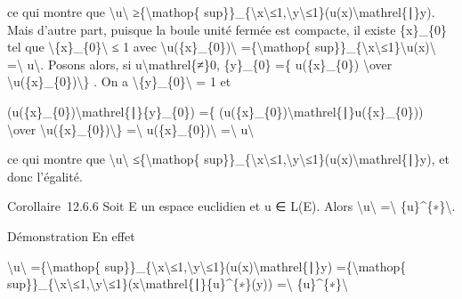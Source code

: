 \documentclass[]{article}
\begin{document}
ce qui montre que \textbackslash{}\textbar{}u\textbackslash{}\textbar{}
≥\{\textbackslash{}mathop\{
sup\}\}\_\{\textbackslash{}\textbar{}x\textbackslash{}\textbar{}≤1,\textbackslash{}\textbar{}y\textbackslash{}\textbar{}≤1\}\textbar{}(u(x)\textbackslash{}mathrel\{∣\}y)\textbar{}.
Mais d'autre part, puisque la boule unité fermée est compacte, il existe
\{x\}\_\{0\} tel que
\textbackslash{}\textbar{}\{x\}\_\{0\}\textbackslash{}\textbar{} ≤ 1
avec \textbackslash{}\textbar{}u(\{x\}\_\{0\})\textbackslash{}\textbar{}
=\{\textbackslash{}mathop\{
sup\}\}\_\{\textbackslash{}\textbar{}x\textbackslash{}\textbar{}≤1\}\textbackslash{}\textbar{}u(x)\textbackslash{}\textbar{}
=\textbackslash{}\textbar{} u\textbackslash{}\textbar{}. Posons alors,
si u\textbackslash{}mathrel\{≠\}0, \{y\}\_\{0\} =\{ u(\{x\}\_\{0\})
\textbackslash{}over
\textbackslash{}\textbar{}u(\{x\}\_\{0\})\textbackslash{}\textbar{}\} .
On a \textbackslash{}\textbar{}\{y\}\_\{0\}\textbackslash{}\textbar{} =
1 et

\textbar{}(u(\{x\}\_\{0\})\textbackslash{}mathrel\{∣\}\{y\}\_\{0\})\textbar{}
=\{ (u(\{x\}\_\{0\})\textbackslash{}mathrel\{∣\}u(\{x\}\_\{0\}))
\textbackslash{}over
\textbackslash{}\textbar{}u(\{x\}\_\{0\})\textbackslash{}\textbar{}\}
=\textbackslash{}\textbar{} u(\{x\}\_\{0\})\textbackslash{}\textbar{}
=\textbackslash{}\textbar{} u\textbackslash{}\textbar{}

ce qui montre que \textbackslash{}\textbar{}u\textbackslash{}\textbar{}
≤\{\textbackslash{}mathop\{
sup\}\}\_\{\textbackslash{}\textbar{}x\textbackslash{}\textbar{}≤1,\textbackslash{}\textbar{}y\textbackslash{}\textbar{}≤1\}\textbar{}(u(x)\textbackslash{}mathrel\{∣\}y)\textbar{},
et donc l'égalité.

Corollaire~12.6.6 Soit E un espace euclidien et u ∈ L(E). Alors
\textbackslash{}\textbar{}u\textbackslash{}\textbar{}
=\textbackslash{}\textbar{} \{u\}\^{}\{∗\}\textbackslash{}\textbar{}.

Démonstration En effet

\textbackslash{}\textbar{}u\textbackslash{}\textbar{}
=\{\textbackslash{}mathop\{
sup\}\}\_\{\textbackslash{}\textbar{}x\textbackslash{}\textbar{}≤1,\textbackslash{}\textbar{}y\textbackslash{}\textbar{}≤1\}\textbar{}(u(x)\textbackslash{}mathrel\{∣\}y)\textbar{}
=\{\textbackslash{}mathop\{
sup\}\}\_\{\textbackslash{}\textbar{}x\textbackslash{}\textbar{}≤1,\textbackslash{}\textbar{}y\textbackslash{}\textbar{}≤1\}\textbar{}(x\textbackslash{}mathrel\{∣\}\{u\}\^{}\{∗\}(y))\textbar{}
=\textbackslash{}\textbar{} \{u\}\^{}\{∗\}\textbackslash{}\textbar{}
\end{document}
